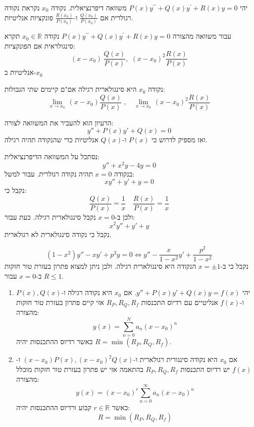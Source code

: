 \documentclass{tstextbook}
\begin{document}
\begin{definition}
יהי  \(P\left(x\right)y^{\prime\prime}+Q\left(x\right)y^{\prime}+R\left(x\right)y=0\) משוואה דיפרנציאלית. נקודה \(x_{0}\) נקראת נקודה רגולרית אם \(\frac{Q(x_{0})}{P(x_{0})}\) ו-\(\frac{R(x_{0})}{P(x_{0})}\) פונקציות אנליטיות.

\end{definition}
\begin{definition}
עבור משוואה מהצורה \(P\left(x\right)y^{\prime\prime}+Q\left(x\right)y^{\prime}+R\left(x\right)y=0\) נקודה \(x_{0}\in \mathbb{R}\) תקרא סינגולראית אם הפונקציות:
$$(x-x_{0})\,\frac{Q(x)}{P(x)},\,\,\left(x-x_{0}\right)^{2}\frac{R(x)}{P(x)}$$
אנליטיות ב-\(x_{0}\)

\end{definition}
\begin{corollary}
נקודה \(x_{0}\) היא סינגולארית רגילה אם"ם קיימים שתי הגבולות:
$$\operatorname*{lim}_{x\to x_{0}}\,\left(x-x_{0}\right){\frac{Q\left(x\right)}{P\left(x\right)}}\;,\quad\operatorname*{lim}_{x\to x_{0}}\,\left(x-x_{0}\right)^{2}{\frac{R\left(x\right)}{P\left(x\right)}}$$

\end{corollary}
\begin{remark}
הרעיון הוא להעביר את המשוואה לצורה:
$$y''+P(x)y'+Q(x)=0$$
ואז מספיק לדרוש כי \(P(x)\) ו-\(Q(x)\) אנליטיות כדי שהנקודה תהיה רגילה.

\end{remark}
\begin{example}
נסתכל על המשוואה הדיפרנציאלית:
$$y''+x^{2}y-4y=0$$
בנקודה \(x=0\) תהיה נקודה רגולרית. עבור למשל:
$$xy''+y'+y=0$$
נקבל כי:
$$\frac{Q(x)}{P(x)}=\frac{1}{x}\quad \frac{R(x)}{P(x)}=\frac{1}{x}$$
ולכן ב-\(x=0\) נקבל סינגולארית רגילה. כעת עבור:
$$x^{2}y''+y'+y$$
נקבל כי נקודה סינגולארית לא רגולארית.

\end{example}
\begin{example}
$$(1-x^{2})y''-xy'+p^{2}y=0\iff y'' - \frac{x}{1-x^{2}}y'+\frac{p^{2}}{1-x^{2}}$$
נקבל כי ב-\(x=\pm 1\) הנקודה היא סינגולארית רגילה. ולכן ניתן למצוא פתרון בעזרת טור חזקות ב-\(x=0\) עבור \(R\leq 1\).

\end{example}
\begin{theorem}[פרוביניוס]
  \begin{enumerate}
    \item יהי \(y''+P(x)y'+Q(x)y=f(x)\). אם \(x_{0}\) היא נקודה רגילה ו-\(P(x),Q(x)\) ו-\(f(x)\) אנליטיים עם רדיוס התכנסות \(R_{P},R_{Q},R_{f}\) אזי קיים פתרון בעזרת טור חזקות מהצורה: 
$$y(x)=\sum_{n=0}^{N}  a_{n}(x-x_{0})^{n}$$
כאשר רדיוס ההתכנסות יהיה \(R=\min(R_{P},R_{Q},R_{f})\).


    \item אם \(x_{0}\) היא נקודה סינגורית רגולארית ו-\((x-x_{0})P(x),(x-x_{0})^{2}Q(x)\) ו-\(f(x)\) יש רדיוס התכנסות \(R_{P},R_{Q},R_{f}\) בהתאמה אזי יש פתרון בעזרת טור חזקות מוכלל מהצורה: 
$$y(x)=(x-x_{0})^{r}\sum_{n=0}^{\infty}a_{n}(x-x_{0})^{n}$$
כאשר \(r\in \mathbb{R}\) קבוע ורדיוס ההתכנסות יהיה:
$$R=\min (R_{P},R_{Q},R_{f})$$


  \end{enumerate}
\end{theorem}
\end{document}
